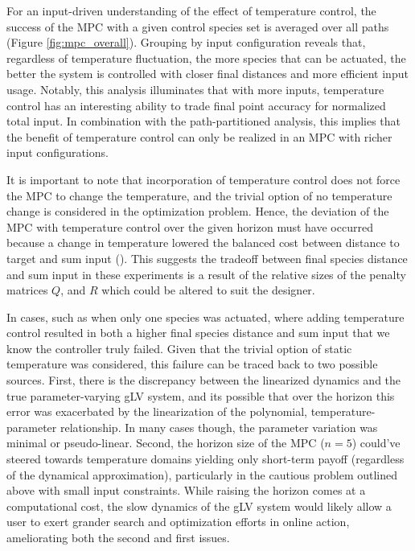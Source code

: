 \documentclass[twocolumn, 10pt]{report}
\begin{document}
{\begin{figure}
\begin{tikzpicture}[
    node distance=4.2cm,
    on grid,
    semithick,
    font=\small]
\end{tikzpicture}
\end{figure}

For an input-driven understanding of the effect of temperature control, the success of the MPC with a given control species set is averaged over all paths (Figure \ref{fig:mpc_overall}). Grouping by input configuration reveals that, regardless of temperature fluctuation, the more species that can be actuated, the better the system is controlled with closer final distances and more efficient input usage. Notably, this analysis illuminates that with more inputs, temperature control has an interesting ability to trade final point accuracy for normalized total input. In combination with the path-partitioned analysis, this implies that the benefit of temperature control can only be realized in an MPC with richer input configurations.

It is important to note that incorporation of temperature control does not force the MPC to change the temperature, and the trivial option of no temperature change is considered in the optimization problem. Hence, the deviation of the MPC with temperature control over the given horizon must have occurred because a change in temperature lowered the balanced cost between distance to target and sum input (\label{MPC_cost}). This suggests the tradeoff between final species distance and sum input in these experiments is a result of the relative sizes of the penalty matrices $Q$, and $R$ which could be altered to suit the designer. 

In cases, such as when only one species was actuated, where adding temperature control resulted in both a higher final species distance and sum input that we know the controller truly failed. Given that the trivial option of static temperature was considered, this failure can be traced back to two possible sources. First, there is the discrepancy between the linearized dynamics and the true parameter-varying gLV system, and its possible that over the horizon this error was exacerbated by the linearization of the polynomial, temperature-parameter relationship. In many cases though, the parameter variation was minimal or pseudo-linear. Second, the horizon size of the MPC ($n=5$) could've steered towards temperature domains yielding only short-term payoff (regardless of the dynamical approximation), particularly in the cautious problem outlined above with small input constraints. While raising the horizon comes at a computational cost, the slow dynamics of the gLV system would likely allow a user to exert grander search and optimization efforts in online action, ameliorating both the second and first issues. 

}
\end{document}
